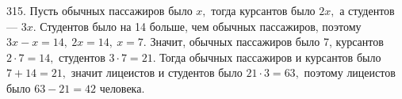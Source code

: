 315. Пусть обычных пассажиров было $x,$ тогда курсантов было $2x,$ а студентов --- $3x.$ Студентов было на 14 больше, чем обычных пассажиров, поэтому $3x-x=14,\ 2x=14,\ x=7.$ Значит, обычных пассажиров было 7, курсантов $2\cdot7=14,$ студентов $3\cdot7=21.$ Тогда обычных пассажиров и курсантов было $7+14=21,$ значит лицеистов и студентов было $21\cdot3=63,$ поэтому лицеистов было $63-21=42$ человека.\\
